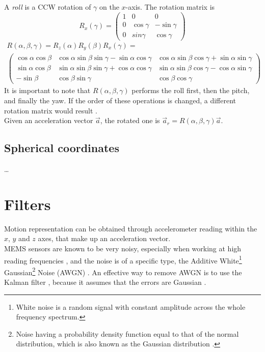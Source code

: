 A \textit{roll} is a CCW rotation of $\gamma$ on the $x$-axis. The rotation matrix is
\[
	R_x(\gamma) =
	\begin{pmatrix}
		1 & 0 & 0 \\
		0 & \cos\gamma & -\sin\gamma \\
		0 & sin\gamma & \cos\gamma
	\end{pmatrix}
\]
\begin{gather*}
	R(\alpha, \beta, \gamma) = R_z(\alpha) R_y(\beta) R_x(\gamma) = \\
	\begin{pmatrix}
		\cos\alpha \cos\beta & \cos\alpha \sin\beta \sin\gamma - \sin\alpha \cos\gamma & \cos\alpha \sin\beta \cos\gamma + \sin\alpha \sin\gamma \\
		\sin\alpha \cos\beta & \sin\alpha \sin\beta \sin\gamma + \cos\alpha \cos\gamma & \sin\alpha \sin\beta \cos\gamma - \cos\alpha \sin\gamma \\
		-\sin\beta & \cos\beta \sin\gamma & \cos\beta \cos\gamma
	\end{pmatrix}
\end{gather*}
It is important to note that $R(\alpha, \beta, \gamma)$ performs the roll first, then the pitch, and finally the yaw. If the order of these operations is changed, a different rotation matrix would result \cite{Lav06}.\\
Given an acceleration vector $\vec a$, the rotated one is $\vec a_r = R(\alpha, \beta, \gamma) \vec a$.

\subsection{Spherical coordinates}
\dots

\section{Filters}
Motion representation can be obtained through accelerometer reading within the $x$, $y$ and $z$ axes, that make up an acceleration vector.\\
MEMS sensors are known to be very noisy, especially when working at high reading frequencies \cite[7]{Mat08}, and the noise is of a specific type, the Additive White\footnote{White noise is a random signal with constant amplitude across the whole frequency spectrum.} Gaussian\footnote{Noise having a probability density function equal to that of the normal distribution, which is also known as the Gaussian distribution \cite{WikipediaGaussianNoise}.} Noise (AWGN) \cite{Yas03}. An effective way to remove AWGN is to use the Kalman filter \cite{Ko07, Sär15}, because it assumes that the errors are Gaussian \cite{Kal60}.

